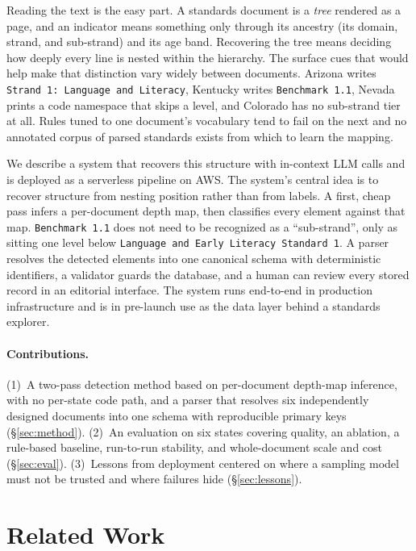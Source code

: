 \documentclass[11pt]{article}
\begin{document}
Reading the text is the easy part. A standards document is a \emph{tree} rendered as a page, and an indicator means something only through its ancestry (its domain, strand, and sub-strand) and its age band. Recovering the tree means deciding how deeply every line is nested within the hierarchy. The surface cues that would help make that distinction vary widely between documents. Arizona writes \texttt{Strand 1: Language and Literacy}, Kentucky writes \texttt{Benchmark 1.1}, Nevada prints a code namespace that skips a level, and Colorado has no sub-strand tier at all. Rules tuned to one document's vocabulary tend to fail on the next and no
annotated corpus of parsed standards exists from which to learn the mapping.

We describe a system that recovers this structure with in-context LLM calls and is deployed as a serverless pipeline on AWS. The system's central idea is to recover structure from nesting position rather than from labels. A first, cheap pass infers a per-document depth map, then classifies every element against that map. \texttt{Benchmark 1.1} does not need to be recognized as a ``sub-strand'', only as sitting one level below \texttt{Language and Early Literacy Standard 1}. A parser resolves the detected elements into one canonical schema with deterministic identifiers, a validator guards the database, and a human can review every stored record in an editorial interface. The system runs end-to-end in production infrastructure and is in pre-launch use as the data layer behind a standards explorer.

\paragraph{Contributions.} (1)~A two-pass detection method based on
per-document depth-map inference, with no per-state code path, and a parser
that resolves six independently designed documents into one schema with
reproducible primary keys (\S\ref{sec:method}). (2)~An evaluation on six
states covering quality, an ablation, a rule-based baseline, run-to-run
stability, and whole-document scale and cost (\S\ref{sec:eval}). (3)~Lessons
from deployment centered on where a sampling model must not be trusted and
where failures hide (\S\ref{sec:lessons}).

\section{Related Work}
\label{sec:related}
\end{document}
